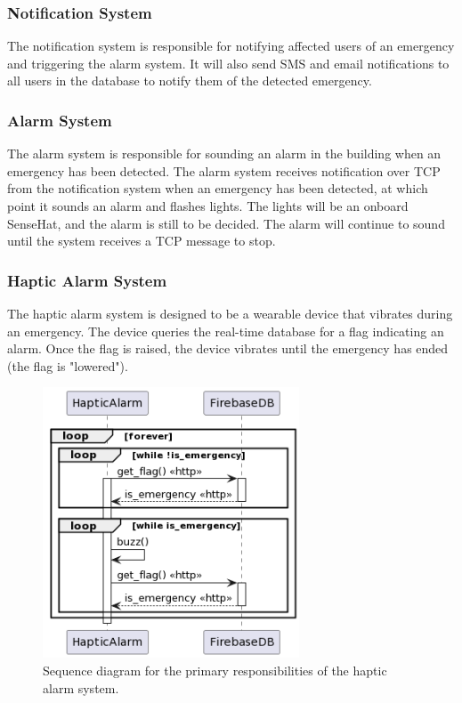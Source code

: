 \subsubsection{Notification System}

The notification system is responsible for notifying affected users of an emergency and triggering the alarm system. It
will also send SMS and email notifications to all users in the database to notify them of the detected emergency.

\subsubsection{Alarm System}

The alarm system is responsible for sounding an alarm in the building when an emergency has been detected. The alarm
system receives notification over TCP from the notification system when an emergency has been detected, at which point
it sounds an alarm and flashes lights. The lights will be an onboard SenseHat, and the alarm is still to be decided.
The alarm will continue to sound until the system receives a TCP message to stop.

\subsubsection{Haptic Alarm System}

The haptic alarm system is designed to be a wearable device that vibrates during an emergency. The device queries the
real-time database for a flag indicating an alarm. Once the flag is raised, the device vibrates until the emergency has
ended (the flag is "lowered").

\begin{figure}[H]
    \centering
    \includegraphics[width=3in]{../assets/HapticAlarmSequence.png}
    \caption{Sequence diagram for the primary responsibilities of the haptic alarm system.}
\end{figure}

